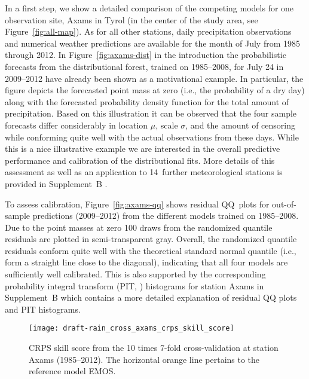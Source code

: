 \documentclass[aoas, preprint]{imsart}
\numberwithin{equation}{subsection}
\begin{document}
In a first step, we show a detailed comparison of the competing models
for one observation site, Axams in Tyrol (in the center of the study area,
see Figure~\ref{fig:all-map}). As for all other stations, daily precipitation 
observations and numerical weather predictions are available for the month of July 
from 1985 through 2012. In Figure~\ref{fig:axams-dist} in the introduction the 
probabilistic forecasts from the distributional forest, trained on 1985--2008, 
for July 24 in 2009--2012 have already been shown as a motivational example. 
In particular, the figure depicts the forecasted point mass at zero
(i.e., the probability of a dry day) along with the forecasted probability 
density function for the total amount of precipitation. Based on this illustration 
it can be observed that the four sample forecasts differ considerably in 
location $\mu$, scale $\sigma$, and the amount of censoring while conforming quite 
well with the actual observations from these days. 
While this is a nice illustrative example we are  
interested in the overall predictive performance and calibration of the
distributional fits. More details of this assessment as well as
an application to 14~further meteorological stations is provided in
Supplement~B \citep{Schlosser+Hothorn+Stauffer:2019b}.

To assess calibration, Figure~\ref{fig:axams-qq} shows residual QQ~plots for
out-of-sample predictions (2009--2012) from the different models trained on
1985--2008. Due to the point masses at zero 100 draws from the randomized
quantile residuals \citep{Dunn+Smyth:1996} are plotted in semi-transparent
gray. Overall, the randomized quantile residuals conform quite well with the
theoretical standard normal quantile (i.e., form a straight line close to the 
diagonal), indicating that all four models are sufficiently well calibrated. 
This is also supported by the corresponding probability integral transform
(PIT, \citealp{Gneiting+Balabdaoui+Raftery:2007}) histograms for station
Axams in Supplement~B \citep{Schlosser+Hothorn+Stauffer:2019b} which 
contains a more detailed explanation of residual QQ plots and PIT histograms.


\begin{figure}[t!]
\centering
{}
\texttt{[image: draft-rain\_cross\_axams\_crps\_skill\_score]}
\caption{\label{fig:axams-crps}CRPS skill score from the 10 times 
7-fold cross-validation at station Axams (1985--2012). The horizontal orange 
line pertains to the reference model EMOS.}
\end{figure}
\end{document}
